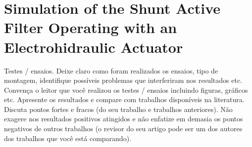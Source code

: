\section{Simulation of the Shunt Active Filter Operating with an Electrohidraulic Actuator}


Testes / ensaios. Deixe claro como foram realizados os ensaios, tipo de montagem, identifique possíveis problemas que interferiram nos resultados etc. 
Convença o leitor que você realizou os testes / ensaios  incluindo figuras, gráficos etc.  
Apresente os resultados e compare com trabalhos disponíveis na literatura. Discuta pontos fortes e fracos (do seu trabalho e trabalhos anteriores). Não exagere nos resultados positivos atingidos e não enfatize em demasia os pontos  negativos de outros trabalhos (o revisor do seu artigo pode ser um dos autores dos trabalhos que você está comparando).